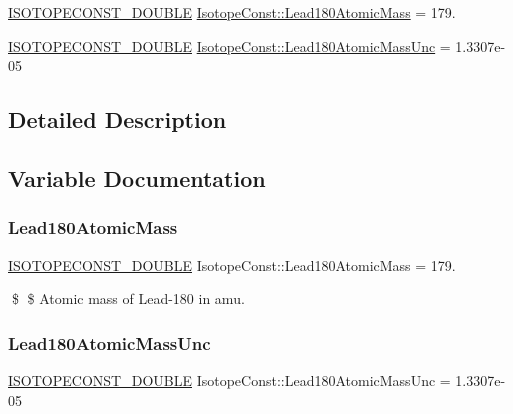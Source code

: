 \begin{DoxyCompactItemize}
\item 
\mbox{\hyperlink{group___isotope_const-_macros_ga8f45a7272ce02c0b4c65c44636ed719a}{I\+S\+O\+T\+O\+P\+E\+C\+O\+N\+S\+T\+\_\+\+D\+O\+U\+B\+LE}} \mbox{\hyperlink{group___isotope_const-_lead-_pb180_ga9e57abc6315992a61e8ec7877b2f0ead}{Isotope\+Const\+::\+Lead180\+Atomic\+Mass}} = 179.
\item 
\mbox{\hyperlink{group___isotope_const-_macros_ga8f45a7272ce02c0b4c65c44636ed719a}{I\+S\+O\+T\+O\+P\+E\+C\+O\+N\+S\+T\+\_\+\+D\+O\+U\+B\+LE}} \mbox{\hyperlink{group___isotope_const-_lead-_pb180_ga584b1211b9e1a7249099559c3372dd35}{Isotope\+Const\+::\+Lead180\+Atomic\+Mass\+Unc}} = 1.\+3307e-\/05
\end{DoxyCompactItemize}


\subsection{Detailed Description}


\subsection{Variable Documentation}
\mbox{\label{group___isotope_const-_lead-_pb180_ga9e57abc6315992a61e8ec7877b2f0ead}} 
\subsubsection{\texorpdfstring{Lead180\+Atomic\+Mass}{Lead180AtomicMass}}
{\footnotesize\ttfamily \mbox{\hyperlink{group___isotope_const-_macros_ga8f45a7272ce02c0b4c65c44636ed719a}{I\+S\+O\+T\+O\+P\+E\+C\+O\+N\+S\+T\+\_\+\+D\+O\+U\+B\+LE}} Isotope\+Const\+::\+Lead180\+Atomic\+Mass = 179.}

\$ \$ Atomic mass of Lead-\/180 in amu. \mbox{\label{group___isotope_const-_lead-_pb180_ga584b1211b9e1a7249099559c3372dd35}} 
\subsubsection{\texorpdfstring{Lead180\+Atomic\+Mass\+Unc}{Lead180AtomicMassUnc}}
{\footnotesize\ttfamily \mbox{\hyperlink{group___isotope_const-_macros_ga8f45a7272ce02c0b4c65c44636ed719a}{I\+S\+O\+T\+O\+P\+E\+C\+O\+N\+S\+T\+\_\+\+D\+O\+U\+B\+LE}} Isotope\+Const\+::\+Lead180\+Atomic\+Mass\+Unc = 1.\+3307e-\/05}


